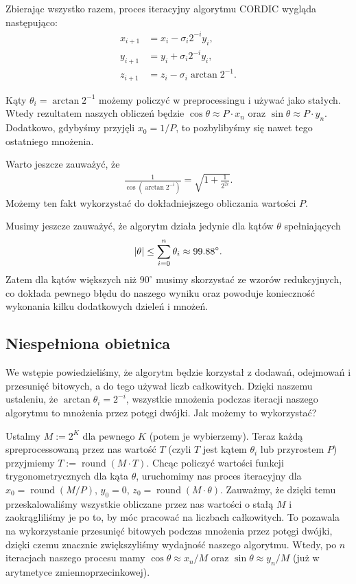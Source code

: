 \documentclass{mwart}
\DeclarePairedDelimiter\abs{\lvert}{\rvert}%
\DeclareMathOperator{\round}{{round}}
\theoremstyle{remark}
\theoremstyle{definition}
\theoremstyle{definition}
\begin{document}
Zbierając wszystko razem, proces iteracyjny algorytmu CORDIC wygląda następująco:
\begin{align*}
  x_{i + 1} & = x_{i} - \sigma_i 2^{-i}y_i,    \\
  y_{i + 1} & = y_i + \sigma_i 2^{-i}y_i,      \\
  z_{i + 1} & = z_i - \sigma_i \arctan 2^{-1}.
\end{align*}

Kąty $\theta_i = \arctan{2^{-1}}$ możemy policzyć w preprocessingu i używać jako stałych. Wtedy rezultatem naszych obliczeń będzie $\cos\theta \approx P\cdot x_n$ oraz $\sin\theta \approx P\cdot y_n$. Dodatkowo, gdybyśmy przyjęli $x_0 = 1/P$, to pozbylibyśmy się nawet tego ostatniego mnożenia.

Warto jeszcze zauważyć, że
\begin{align*}
  \frac{1}{\cos(\arctan 2^{-i})} = \sqrt{1 + \frac{1}{2^{2i}}}.
\end{align*}
Możemy ten fakt wykorzystać do dokładniejszego obliczania wartości $P$.

Musimy jeszcze zauważyć, że algorytm działa jedynie dla kątów $\theta$ spełniających
\begin{align*}
  \abs{\theta} \leq \sum_{i=0}^n\theta_i \approx 99.88^{\circ}.
\end{align*}
Zatem dla kątów większych niż $90^{\circ}$ musimy skorzystać ze wzorów redukcyjnych, co dokłada pewnego błędu do naszego wyniku oraz powoduje konieczność wykonania kilku dodatkowych dzieleń i mnożeń.

\subsection{Niespełniona obietnica}
We wstępie powiedzieliśmy, że algorytm będzie korzystał z dodawań, odejmowań i przesunięć bitowych, a do tego używał liczb całkowitych. Dzięki naszemu ustaleniu, że $\arctan\theta_i = 2^{-i}$, wszystkie mnożenia podczas iteracji naszego algorytmu to mnożenia przez potęgi dwójki. Jak możemy to wykorzystać?

Ustalmy $M := 2^{K}$ dla pewnego $K$ (potem je wybierzemy). Teraz każdą spreprocessowaną 
przez nas wartość $T$ (czyli $T$ jest kątem $\theta_i$ lub przyrostem $P$) przyjmiemy 
$T := \round(M \cdot T)$. Chcąc policzyć wartości funkcji trygonometrycznych dla kąta $\theta$, 
uruchomimy nas proces iteracyjny dla $x_0 = \round(M/P)$, $y_0 = 0$, $z_0 = \round(M\cdot\theta)$. 
Zauważmy, że dzięki temu przeskalowaliśmy wszystkie obliczane przez nas wartości o stałą $M$
i zaokrągliliśmy je po to, by móc pracować na liczbach całkowitych. To pozawala na wykorzystanie 
przesunięć bitowych podczas mnożenia przez potęgi dwójki, dzięki czemu znacznie zwiększyliśmy 
wydajność naszego algorytmu. Wtedy, po $n$ iteracjach naszego procesu mamy $\cos\theta \approx x_n/M$
oraz $\sin\theta\approx y_n/M$ (już w arytmetyce zmiennoprzecinkowej).
\end{document}

